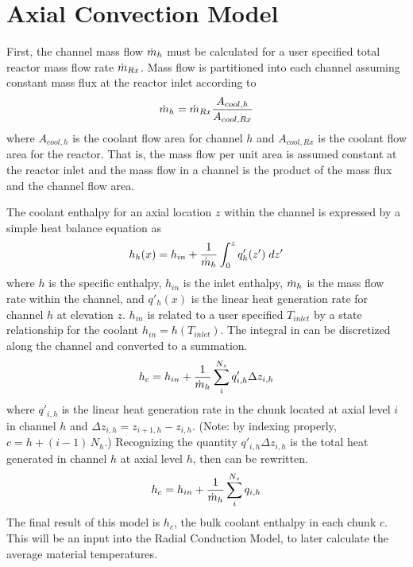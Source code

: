 \section{Axial Convection Model}
  First, the channel mass flow $\dot{m}_h$ must be calculated for a user specified
  total reactor mass flow rate $\dot{m}_{Rx}$.  Mass flow is partitioned into each
  channel assuming constant mass flux at the reactor inlet according to 
  \begin{equation}
    \label{eq:mass_flow_split}
    \dot{m}_h = \dot{m}_{Rx} \frac{A_{cool,h}}{A_{cool,Rx}}
  \end{equation}
  where $A_{cool,h}$ is the coolant flow area for channel $h$ and $A_{cool,Rx}$
  is the coolant flow area for the reactor.  That is, the mass 
  flow per unit area is assumed constant at the reactor inlet and the mass flow 
  in a channel is the product of the mass flux and the channel flow area. 
  
  The coolant enthalpy for an axial location $z$ within the channel is expressed
  by a simple heat balance equation as
  \begin{equation}
    \label{eq:continuous_heat_balance}
    h_h(x) = h_{in} + \frac{1}{\dot{m}_h} \int_0^z q'_h(z') \; dz'
  \end{equation}
  where $h$ is the specific enthalpy, $h_{in}$ is the inlet enthalpy, $\dot{m}_h$
  is the mass flow rate within the channel, and $q'_h(x)$ is the linear heat 
  generation rate for channel $h$ at elevation $z$. $h_{in}$ is related to a
  user specified 
  $T_{inlet}$ by a state relationship for the coolant $h_{in} = h(T_{inlet})$.
  The integral in  can be discretized along the
  channel and converted to a summation.
  \begin{equation}
    \label{eq:heat_balance}
    h_c = h_{in} + \frac{1}{\dot{m}_h} \sum_{i}^{N_z} q'_{i,h} \Delta z_{i,h}
  \end{equation}
  where $q'_{i,h}$ is the linear heat generation rate in the chunk located at 
  axial level $i$ in 
  channel $h$ and $\Delta z_{i,h} = z_{i+1,h} - z_{i,h}$. (Note: by indexing
  properly, $c = h + (i-1) \, N_h$.) Recognizing the 
  quantity $q'_{i,h} \Delta z_{i,h}$ is the total heat generated in channel $h$ 
  at axial level $h$, then  can be rewritten.
  \begin{equation}
    h_c = h_{in} + \frac{1}{\dot{m}_h} \sum_i^{N_z} q_{i,h}
  \end{equation}
  The final result of this model is $h_c$, the bulk coolant enthalpy in each
  chunk $c$. This will be an input into the Radial Conduction Model,
   to later calculate the average material
  temperatures.
  
